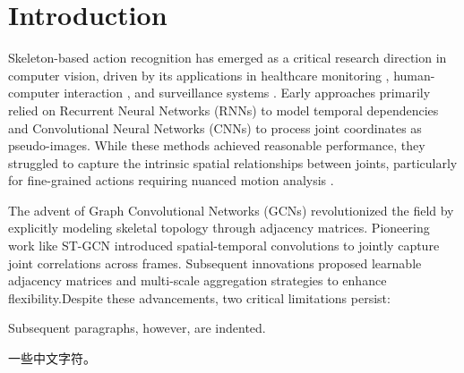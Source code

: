 \section{Introduction}

Skeleton-based action recognition has emerged as a critical research 
direction in computer vision, driven by its applications in healthcare 
monitoring \cite{ref1}, human-computer interaction \cite{ref2}, and surveillance systems \cite{ref3}.
Early approaches primarily relied on Recurrent Neural Networks (RNNs) \cite{ref4,ref5} 
to model temporal dependencies and Convolutional Neural Networks (CNNs) \cite{ref6}
to process joint coordinates as pseudo-images. While these methods achieved 
reasonable performance, they struggled to capture the intrinsic spatial 
relationships between joints, particularly for fine-grained actions 
requiring nuanced motion analysis \cite{ref7}.


The advent of Graph Convolutional Networks (GCNs) \cite{ref8} revolutionized the field by 
explicitly modeling skeletal topology through adjacency matrices. Pioneering 
work like ST-GCN \cite{ref7} introduced spatial-temporal convolutions to jointly 
capture joint correlations across frames. Subsequent innovations proposed 
learnable adjacency matrices \cite{ref9,ref10} and multi-scale aggregation 
strategies \cite{ref11} to enhance flexibility.Despite these advancements, 
two critical limitations persist:

Subsequent paragraphs, however, are indented.

一些中文字符。